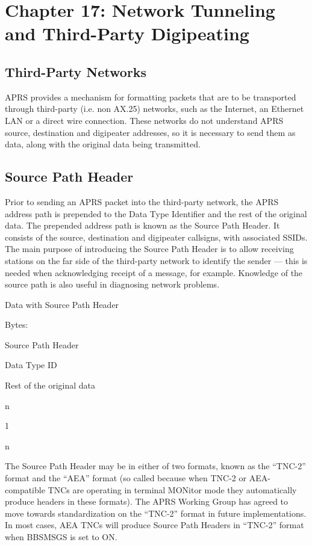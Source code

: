 \chapter{Chapter 17: Network Tunneling and Third-Party Digipeating}

\section{Third-Party Networks}

APRS provides a mechanism for formatting packets that are to be transported
through third-party (i.e. non AX.25) networks, such as the Internet, an
Ethernet LAN or a direct wire connection.
These networks do not understand APRS source, destination and digipeater
addresses, so it is necessary to send them as data, along with the original data
being transmitted.

\section{Source Path Header}

Prior to sending an APRS packet into the third-party network, the APRS
address path is prepended to the Data Type Identifier and the rest of the
original data.
The prepended address path is known as the Source Path Header. It consists
of the source, destination and digipeater callsigns, with associated SSIDs.
The main purpose of introducing the Source Path Header is to allow
receiving stations on the far side of the third-party network to identify the
sender — this is needed when acknowledging receipt of a message, for
example. Knowledge of the source path is also useful in diagnosing network
problems.

Data with Source Path Header

Bytes:

Source
Path
Header

Data
Type
ID

Rest of the original data

n

1

n

The Source Path Header may be in either of two formats, known as the
“TNC-2” format and the “AEA” format (so called because when TNC-2 or
AEA-compatible TNCs are operating in terminal MONitor mode they
automatically produce headers in these formats).
The APRS Working Group has agreed to move towards standardization on
the “TNC-2” format in future implementations.
In most cases, AEA TNCs will produce Source Path Headers in “TNC-2”
format when BBSMSGS is set to ON.

